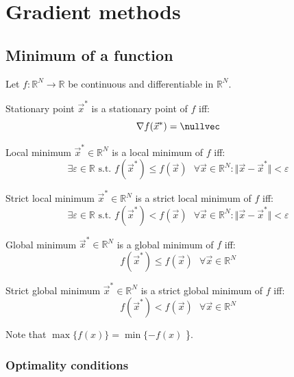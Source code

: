 \chapter{Gradient methods}


\section{Minimum of a function}

Let $f: \mathbb{R}^N \rightarrow \mathbb{R}$ be continuous and differentiable in $\mathbb{R}^N$.
\begin{descriptionlist}
    \item[Stationary point] 
        $\vec{x}^*$ is a stationary point of $f$ iff: 
        \[ \nabla f(\vec{x}^*) = \nullvec \]

    \item[Local minimum] 
        $\vec{x}^* \in \mathbb{R}^N$ is a local minimum of $f$ iff:
        \[ \exists \varepsilon \in \mathbb{R} \text{ s.t. } 
            f(\vec{x}^*) \leq f(\vec{x}) \text{ } \forall \vec{x} \in \mathbb{R}^N: \Vert \vec{x} - \vec{x}^* \Vert < \varepsilon \]
        
    \item[Strict local minimum] 
        $\vec{x}^* \in \mathbb{R}^N$ is a strict local minimum of $f$ iff:
        \[ \exists \varepsilon \in \mathbb{R} \text{ s.t. }
            f(\vec{x}^*) < f(\vec{x}) \text{ } \forall \vec{x} \in \mathbb{R}^N: \Vert \vec{x} - \vec{x}^* \Vert < \varepsilon \]

    \item[Global minimum] 
        $\vec{x}^* \in \mathbb{R}^N$ is a global minimum of $f$ iff:
        \[ f(\vec{x}^*) \leq f(\vec{x}) \text{ } \forall \vec{x} \in \mathbb{R}^N \]
        
    \item[Strict global minimum] 
        $\vec{x}^* \in \mathbb{R}^N$ is a strict global minimum of $f$ iff:
        \[ f(\vec{x}^*) < f(\vec{x}) \text{ } \forall \vec{x} \in \mathbb{R}^N \]
\end{descriptionlist}

Note that $\max \{ f(x) \} = \min \{ -f(x)$ \}. 


\subsection{Optimality conditions}

